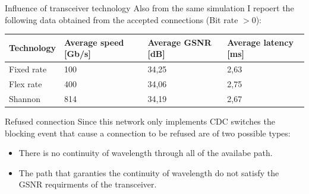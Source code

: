 \documentclass{beamer}
\begin{document}
	\begin{frame}{Influence of transceiver technology}
		Also from the same simulation I repoert the following data obtained from the accepted connections (Bit rate $>0$):\\
		
		\centering
		\begin{tabular}{|V{3cm}|V{3cm}|V{3cm}|V{3cm}|}
			\hline Technology & Average speed [Gb/s] & Average GSNR [dB] & Average latency [ms] \\
			\hline Fixed rate & 100 & 34,25 & 2,63 \\
			\hline Flex rate & 400 & 34,06 & 2,75 \\
			\hline Shannon & 814 & 34,19 & 2,67 \\ 
			\hline
		\end{tabular}
	\end{frame}
	\begin{frame}{Refused connection}
		Since this network only implements CDC switches the blocking event that cause a connection to be refused are of two possible types:
		\begin{itemize}
			\item There is no continuity of wavelength through all of the availabe path.
			\item The path that garanties the continuity of wavelength do not satisfy the GSNR requirments of the transceiver.
		\end{itemize}
	\end{frame}
\end{document}
